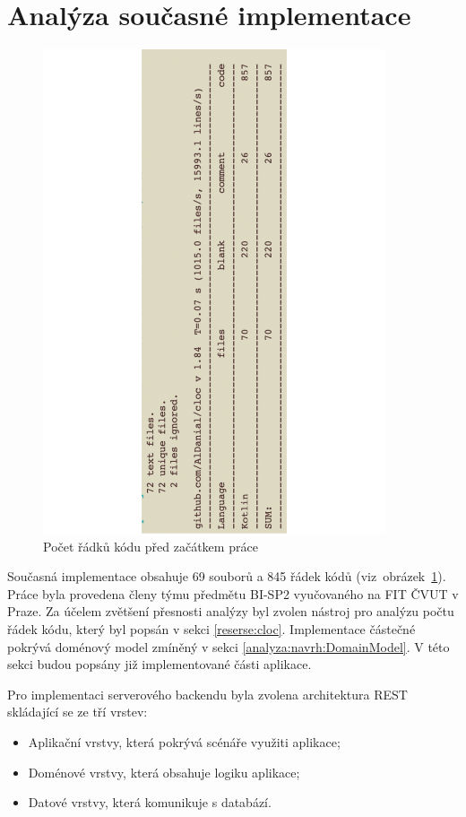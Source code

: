 \section{Analýza současné implementace}\label{analyza:soucasnaImplementace}
    \begin{figure}\centering
	   \includegraphics[angle=-90, width=0.9\textwidth]{pdfs/Cloc1}
	   \caption[Počet řádků kódu před začátkem práce]{Počet řádků kódu před začátkem práce}\label{image:cloc1}
    \end{figure}
    Současná implementace obsahuje 69 souborů a 845 řádek kódů (viz~obrázek~\ref{image:cloc1}). Práce byla provedena členy týmu předmětu BI-SP2 vyučovaného na FIT ČVUT v Praze. Za účelem zvětšení přesnosti analýzy byl zvolen nástroj pro analýzu počtu řádek kódu, který byl popsán v sekci \ref{reserse:cloc}. Implementace částečné pokrývá doménový model zmíněný v sekci \ref{analyza:navrh:DomainModel}. V této sekci budou popsány již implementované části aplikace. 
     
    Pro implementaci serverového backendu byla zvolena architektura REST skládající se ze tří vrstev:
    \begin{itemize}
         \item Aplikační vrstvy, která pokrývá scénáře využiti aplikace;
         \item Doménové vrstvy, která obsahuje logiku aplikace;
         \item Datové vrstvy, která komunikuje s databází.
    \end{itemize}
    
